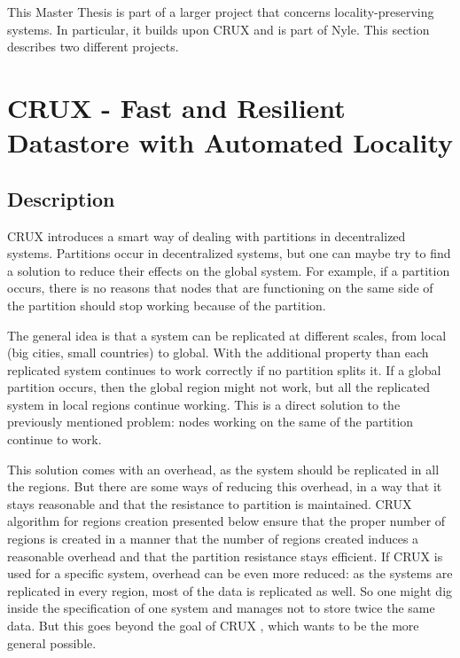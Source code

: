 \documentclass[a4paper,11pt,oneside]{report}
\begin{document}

This Master Thesis is part of a larger project that concerns
locality-preserving systems. In particular, it builds upon
CRUX \cite{Basescu2014} and is part of Nyle. This section describes two
different projects. 

\section{CRUX - Fast and Resilient Datastore with Automated Locality}

\subsection{Description}
CRUX \cite{Basescu2014} introduces a smart way of dealing with partitions in
decentralized systems. Partitions occur in decentralized systems, but one can
maybe try to find a solution to reduce their effects on the global system. For
example, if a partition occurs, there is no reasons that nodes that are
functioning on the same side of the partition should stop working because of
the partition. 

The general idea is that a system can be replicated at different scales, from
local (big cities, small countries) to global. With the additional property
than each replicated system continues to work correctly if no partition
splits it. If a global partition occurs, then the global region might not work,
but all the replicated system in local regions continue working. This is a
direct solution to the previously mentioned problem: nodes working on the same
of the partition continue to work.

This solution comes with an overhead, as the system should be replicated in all
the regions. But there are some ways of reducing this overhead, in a way that
it stays reasonable and that the resistance to partition is maintained. CRUX
algorithm for regions creation \cite{Basescu2014} presented below ensure that
the proper number of regions is created in a manner that the number of regions
created induces a reasonable overhead and that the partition resistance stays
efficient. If CRUX \cite{Basescu2014} is used for a specific system, overhead
can be even more reduced: as the systems are replicated in every region, most
of the data is replicated as well. So one might dig inside the specification of
one system and manages not to store twice the same data. But this goes beyond
the goal of CRUX \cite{Basescu2014}, which wants to be the more general
possible. 
\end{document}
